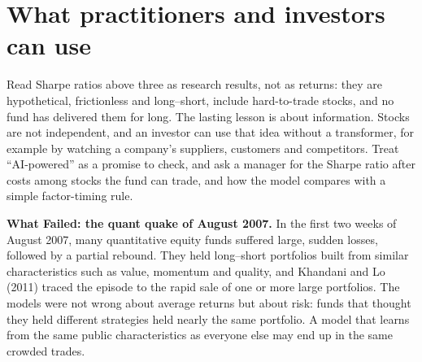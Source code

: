 \section{What practitioners and investors can use}
\label{sec:22-investors}

Read Sharpe ratios above three as research results, not as returns: they are hypothetical, frictionless and long--short, include hard-to-trade stocks, and no fund has delivered them for long. The lasting lesson is about information. Stocks are not independent, and an investor can use that idea without a transformer, for example by watching a company's suppliers, customers and competitors. Treat ``AI-powered'' as a promise to check, and ask a manager for the Sharpe ratio after costs among stocks the fund can trade, and how the model compares with a simple factor-timing rule.

\begin{callout}
\textbf{What Failed: the quant quake of August 2007.} In the first two weeks of August 2007, many quantitative equity funds suffered large, sudden losses, followed by a partial rebound. They held long--short portfolios built from similar characteristics such as value, momentum and quality, and Khandani and Lo (2011) traced the episode to the rapid sale of one or more large portfolios. The models were not wrong about average returns but about risk: funds that thought they held different strategies held nearly the same portfolio. A model that learns from the same public characteristics as everyone else may end up in the same crowded trades.
\end{callout}

\makeatletter
{}
\makeatother

